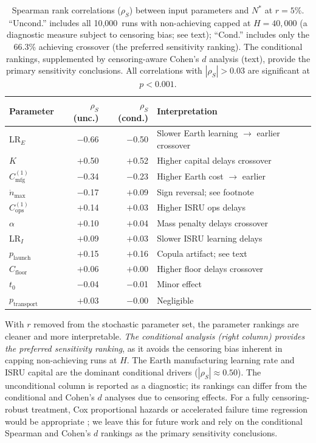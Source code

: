 \documentclass[preprint,12pt]{elsarticle}
\begin{document}
\begin{table}[htbp]
\centering
\caption{Spearman rank correlations ($\rho_S$) between input parameters and $N^*$ at $r = 5\%$. ``Uncond.'' includes all 10{,}000~runs with non-achieving capped at $H = 40{,}000$ (a diagnostic measure subject to censoring bias; see text); ``Cond.'' includes only the 66.3\% achieving crossover (the preferred sensitivity ranking). The conditional rankings, supplemented by censoring-aware Cohen's $d$ analysis (text), provide the primary sensitivity conclusions. All correlations with $|\rho_S| > 0.03$ are significant at $p < 0.001$.}
\label{tab:spearman}
\begin{tabular}{@{}lrrp{4.5cm}@{}}
\toprule
Parameter & $\rho_S$ (unc.) & $\rho_S$ (cond.) & Interpretation \\
\midrule
LR$_E$     & $-$0.66 & $-$0.50 & Slower Earth learning $\rightarrow$ earlier crossover \\
$K$               & $+$0.50 & $+$0.52 & Higher capital delays crossover \\
$C_{\mathrm{mfg}}^{(1)}$ & $-$0.34 & $-$0.23 & Higher Earth cost $\rightarrow$ earlier \\
$\dot{n}_{\max}$ & $-$0.17 & $+$0.09 & Sign reversal; see footnote \\
$C_{\mathrm{ops}}^{(1)}$ & $+$0.14 & $+$0.03 & Higher ISRU ops delays \\
$\alpha$          & $+$0.10 & $+$0.04 & Mass penalty delays crossover \\
LR$_I$      & $+$0.09 & $+$0.03 & Slower ISRU learning delays \\
$p_{\mathrm{launch}}$   & $+$0.15 & $+$0.16 & Copula artifact; see text \\
$C_{\mathrm{floor}}$ & $+$0.06 & $+$0.00 & Higher floor delays crossover \\
$t_0$             & $-$0.04 & $-$0.01 & Minor effect \\
$p_{\mathrm{transport}}$ & $+$0.03 & $-$0.00 & Negligible \\
\bottomrule
\end{tabular}
\end{table}

With $r$ removed from the stochastic parameter set, the parameter rankings are cleaner and more interpretable. \emph{The conditional analysis (right column) provides the preferred sensitivity ranking}, as it avoids the censoring bias inherent in capping non-achieving runs at $H$. The Earth manufacturing learning rate and ISRU capital are the dominant conditional drivers ($|\rho_S| \approx 0.50$). The unconditional column is reported as a diagnostic; its rankings can differ from the conditional and Cohen's $d$ analyses due to censoring effects. For a fully censoring-robust treatment, Cox proportional hazards or accelerated failure time regression would be appropriate \cite{kaplan1958}; we leave this for future work and rely on the conditional Spearman and Cohen's $d$ rankings as the primary sensitivity conclusions.
\end{document}
